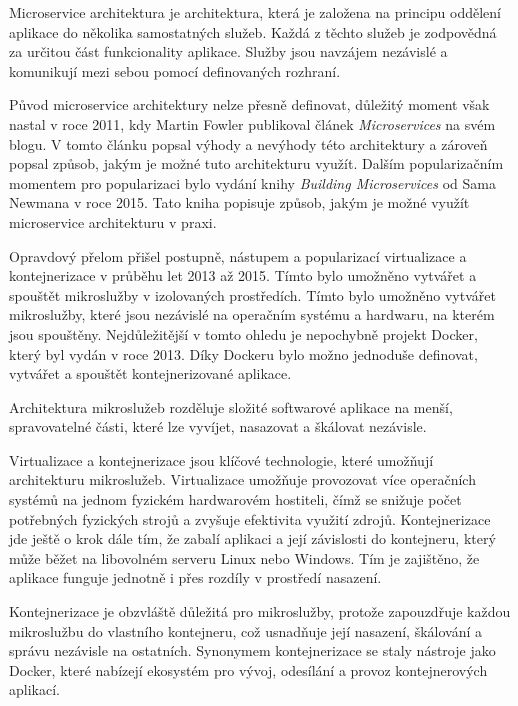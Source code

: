 Microservice architektura je architektura, která je založena na principu oddělení aplikace do několika samostatných služeb. Každá z těchto služeb je zodpovědná za určitou část funkcionality aplikace. Služby jsou navzájem nezávislé a komunikují mezi sebou pomocí definovaných rozhraní. \cite{Richardson2018}

Původ microservice architektury nelze přesně definovat, důležitý moment však nastal v roce 2011, kdy Martin Fowler publikoval článek \textit{Microservices} na svém blogu. V tomto článku popsal výhody a nevýhody této architektury a zároveň popsal způsob, jakým je možné tuto architekturu využít. Dalším popularizačním momentem pro popularizaci bylo vydání knihy \textit{Building Microservices} od Sama Newmana v roce 2015. Tato kniha popisuje způsob, jakým je možné využít microservice architekturu v praxi.

Opravdový přelom přišel postupně, nástupem a popularizací virtualizace a kontejnerizace v průběhu let 2013 až 2015. Tímto bylo umožněno vytvářet a spouštět mikroslužby v izolovaných prostředích. Tímto bylo umožněno vytvářet mikroslužby, které jsou nezávislé na operačním systému a hardwaru, na kterém jsou spouštěny. Nejdůležitější v tomto ohledu je nepochybně projekt Docker, který byl vydán v roce 2013. Díky Dockeru bylo možno jednoduše definovat, vytvářet a spouštět kontejnerizované aplikace.


Architektura mikroslužeb rozděluje složité softwarové aplikace na menší, spravovatelné části, které lze vyvíjet, nasazovat a škálovat nezávisle.


Virtualizace a kontejnerizace jsou klíčové technologie, které umožňují architekturu mikroslužeb. Virtualizace umožňuje provozovat více operačních systémů na jednom fyzickém hardwarovém hostiteli, čímž se snižuje počet potřebných fyzických strojů a zvyšuje efektivita využití zdrojů. Kontejnerizace jde ještě o krok dále tím, že zabalí aplikaci a její závislosti do kontejneru, který může běžet na libovolném serveru Linux nebo Windows. Tím je zajištěno, že aplikace funguje jednotně i přes rozdíly v prostředí nasazení.

Kontejnerizace je obzvláště důležitá pro mikroslužby, protože zapouzdřuje každou mikroslužbu do vlastního kontejneru, což usnadňuje její nasazení, škálování a správu nezávisle na ostatních. Synonymem kontejnerizace se staly nástroje jako Docker, které nabízejí ekosystém pro vývoj, odesílání a provoz kontejnerových aplikací.

